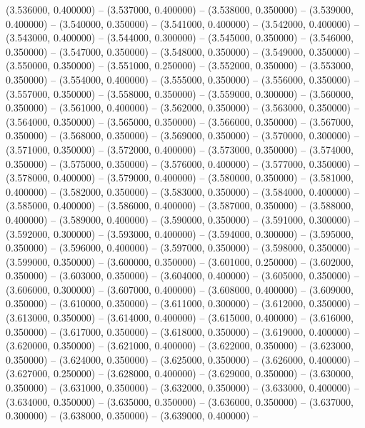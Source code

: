 (3.536000, 0.400000) -- 
(3.537000, 0.400000) -- 
(3.538000, 0.350000) -- 
(3.539000, 0.400000) -- 
(3.540000, 0.350000) -- 
(3.541000, 0.400000) -- 
(3.542000, 0.400000) -- 
(3.543000, 0.400000) -- 
(3.544000, 0.300000) -- 
(3.545000, 0.350000) -- 
(3.546000, 0.350000) -- 
(3.547000, 0.350000) -- 
(3.548000, 0.350000) -- 
(3.549000, 0.350000) -- 
(3.550000, 0.350000) -- 
(3.551000, 0.250000) -- 
(3.552000, 0.350000) -- 
(3.553000, 0.350000) -- 
(3.554000, 0.400000) -- 
(3.555000, 0.350000) -- 
(3.556000, 0.350000) -- 
(3.557000, 0.350000) -- 
(3.558000, 0.350000) -- 
(3.559000, 0.300000) -- 
(3.560000, 0.350000) -- 
(3.561000, 0.400000) -- 
(3.562000, 0.350000) -- 
(3.563000, 0.350000) -- 
(3.564000, 0.350000) -- 
(3.565000, 0.350000) -- 
(3.566000, 0.350000) -- 
(3.567000, 0.350000) -- 
(3.568000, 0.350000) -- 
(3.569000, 0.350000) -- 
(3.570000, 0.300000) -- 
(3.571000, 0.350000) -- 
(3.572000, 0.400000) -- 
(3.573000, 0.350000) -- 
(3.574000, 0.350000) -- 
(3.575000, 0.350000) -- 
(3.576000, 0.400000) -- 
(3.577000, 0.350000) -- 
(3.578000, 0.400000) -- 
(3.579000, 0.400000) -- 
(3.580000, 0.350000) -- 
(3.581000, 0.400000) -- 
(3.582000, 0.350000) -- 
(3.583000, 0.350000) -- 
(3.584000, 0.400000) -- 
(3.585000, 0.400000) -- 
(3.586000, 0.400000) -- 
(3.587000, 0.350000) -- 
(3.588000, 0.400000) -- 
(3.589000, 0.400000) -- 
(3.590000, 0.350000) -- 
(3.591000, 0.300000) -- 
(3.592000, 0.300000) -- 
(3.593000, 0.400000) -- 
(3.594000, 0.300000) -- 
(3.595000, 0.350000) -- 
(3.596000, 0.400000) -- 
(3.597000, 0.350000) -- 
(3.598000, 0.350000) -- 
(3.599000, 0.350000) -- 
(3.600000, 0.350000) -- 
(3.601000, 0.250000) -- 
(3.602000, 0.350000) -- 
(3.603000, 0.350000) -- 
(3.604000, 0.400000) -- 
(3.605000, 0.350000) -- 
(3.606000, 0.300000) -- 
(3.607000, 0.400000) -- 
(3.608000, 0.400000) -- 
(3.609000, 0.350000) -- 
(3.610000, 0.350000) -- 
(3.611000, 0.300000) -- 
(3.612000, 0.350000) -- 
(3.613000, 0.350000) -- 
(3.614000, 0.400000) -- 
(3.615000, 0.400000) -- 
(3.616000, 0.350000) -- 
(3.617000, 0.350000) -- 
(3.618000, 0.350000) -- 
(3.619000, 0.400000) -- 
(3.620000, 0.350000) -- 
(3.621000, 0.400000) -- 
(3.622000, 0.350000) -- 
(3.623000, 0.350000) -- 
(3.624000, 0.350000) -- 
(3.625000, 0.350000) -- 
(3.626000, 0.400000) -- 
(3.627000, 0.250000) -- 
(3.628000, 0.400000) -- 
(3.629000, 0.350000) -- 
(3.630000, 0.350000) -- 
(3.631000, 0.350000) -- 
(3.632000, 0.350000) -- 
(3.633000, 0.400000) -- 
(3.634000, 0.350000) -- 
(3.635000, 0.350000) -- 
(3.636000, 0.350000) -- 
(3.637000, 0.300000) -- 
(3.638000, 0.350000) -- 
(3.639000, 0.400000) -- 
